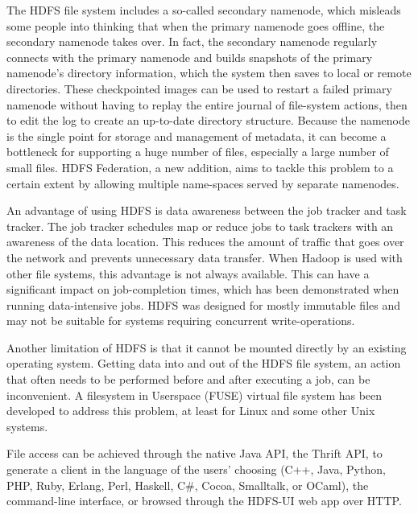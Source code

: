 \documentclass[conference]{IEEEtran}
\begin{document}
\begin{enumerate}
\par The HDFS file system includes a so-called secondary namenode, which misleads some people into thinking that when the primary namenode goes offline, the secondary namenode takes over. In fact, the secondary namenode regularly connects with the primary namenode and builds snapshots of the primary namenode's directory information, which the system then saves to local or remote directories. These checkpointed images can be used to restart a failed primary namenode without having to replay the entire journal of file-system actions, then to edit the log to create an up-to-date directory structure. Because the namenode is the single point for storage and management of metadata, it can become a bottleneck for supporting a huge number of files, especially a large number of small files. HDFS Federation, a new addition, aims to tackle this problem to a certain extent by allowing multiple name-spaces served by separate namenodes.
\par An advantage of using HDFS is data awareness between the job tracker and task tracker. The job tracker schedules map or reduce jobs to task trackers with an awareness of the data location.
This reduces the amount of traffic that goes over the network and prevents unnecessary data transfer. When Hadoop is used with other file systems, this advantage is not always available. This can have a significant impact on job-completion times, which has been demonstrated when running data-intensive jobs. HDFS was designed for mostly immutable files and may not be suitable for systems requiring concurrent write-operations.
\par Another limitation of HDFS is that it cannot be mounted directly by an existing operating system. Getting data into and out of the HDFS file system, an action that often needs to be performed before and after executing a job, can be inconvenient. A filesystem in Userspace (FUSE) virtual file system has been developed to address this problem, at least for Linux and some other Unix systems.
\par File access can be achieved through the native Java API, the Thrift API, to generate a client in the language of the users' choosing (C++, Java, Python, PHP, Ruby, Erlang, Perl, Haskell, C\#, Cocoa, Smalltalk, or OCaml), the command-line interface, or browsed through the HDFS-UI web app over HTTP.


\end{enumerate}
\end{document}
